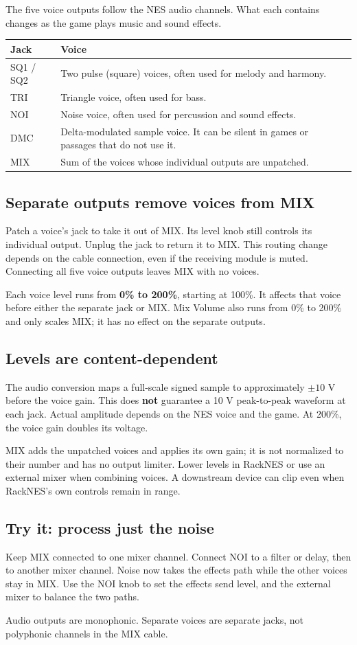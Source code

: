 The five voice outputs follow the NES audio channels. What each contains
changes as the game plays music and sound effects.
\begin{center}
\begin{tabularx}{\textwidth}{@{}l X@{}}
\toprule
\textbf{Jack} & \textbf{Voice} \\
\midrule
SQ1 / SQ2 & Two pulse (square) voices, often used for melody and harmony. \\
TRI & Triangle voice, often used for bass. \\
NOI & Noise voice, often used for percussion and sound effects. \\
DMC & Delta-modulated sample voice. It can be silent in games or passages that do not use it. \\
MIX & Sum of the voices whose individual outputs are unpatched. \\
\bottomrule
\end{tabularx}
\end{center}

\subsection{Separate outputs remove voices from MIX}
Patch a voice's jack to take it out of MIX. Its level knob still controls
its individual output. Unplug the jack to return it to MIX. This routing
change depends on the cable connection, even if the receiving module is
muted. Connecting all five voice outputs leaves MIX with no voices.

Each voice level runs from \textbf{0\% to 200\%}, starting at 100\%.
It affects that voice before either the separate jack or MIX. Mix Volume
also runs from 0\% to 200\% and only scales MIX; it has no effect on the
separate outputs.

\subsection{Levels are content-dependent}
The audio conversion maps a full-scale signed sample to approximately
$\pm10$ V before the voice gain. This does \textbf{not} guarantee a 10 V
peak-to-peak waveform at each jack. Actual amplitude depends on the NES
voice and the game. At 200\%, the voice gain doubles its voltage.

MIX adds the unpatched voices and applies its own gain; it is not normalized
to their number and has no output limiter. Lower levels in RackNES or use
an external mixer when combining voices. A downstream device can clip even
when RackNES's own controls remain in range.

\subsection{Try it: process just the noise}
Keep MIX connected to one mixer channel. Connect NOI to a filter or delay,
then to another mixer channel. Noise now takes the effects path while the
other voices stay in MIX. Use the NOI knob to set the effects send level,
and the external mixer to balance the two paths.

Audio outputs are monophonic. Separate voices are separate jacks, not
polyphonic channels in the MIX cable.
